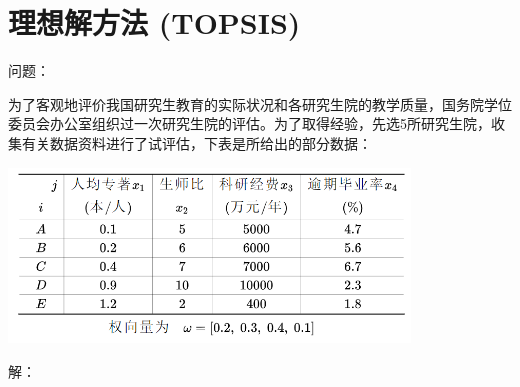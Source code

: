 \documentclass[12pt,a4paper]{article}
\begin{document}
\section{理想解方法 (TOPSIS)}
问题：

为了客观地评价我国研究生教育的实际状况和各研究生院的教学质量，国务院学位委员会办公室组织过一次研究生院的评估。为了取得经验，先选5所研究生院，收集有关数据资料进行了试评估，下表是所给出的部分数据：
\begin{center}
  \includegraphics[width = 0.8\textwidth]{figures/topsis_data.png}
\end{center}
解：
\end{document}
